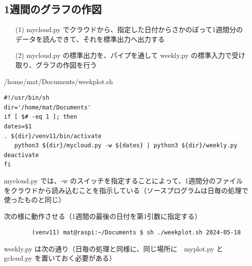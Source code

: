 \documentclass[12pt,a4j]{jsbook}
\begin{document}
\newpage

\subsection{1週間のグラフの作図}

\begin{enumerate}
	\item[(1)] mycloud.py でクラウドから、指定した日付からさかのぼって1週間分のデータを読んできて、それを標準出力へ出力する
	\item[(2)] mycloud.py の標準出力を、パイプを通して weekly.py の標準入力で受け取り、グラフの作図を行う
\end{enumerate}

\begin{spacing}{0.95}
\begin{itembox}[l]{/home/mat/Documents/weekplot.sh}
\begin{verbatim}
#!/usr/bin/sh
dir='/home/mat/Documents'
if [ $# -eq 1 ]; then
dates=$1
. ${dir}/venv11/bin/activate
   python3 ${dir}/mycloud.py -w ${dates} | python3 ${dir}/weekly.py
deactivate
fi
\end{verbatim}
\end{itembox}
\end{spacing}

mycloud.py では、-w のスイッチを指定することによって、1週間分のファイルをクラウドから読み込むことを指示している（ソースプログラムは日毎の処理で使ったものと同じ）

次の様に動作させる（1週間の最後の日付を第1引数に指定する）

\begin{spacing}{0.95}
\begin{screen}
\begin{verbatim}
		(venv11) mat@raspi:~/Documents $ sh ./weekplot.sh 2024-05-18
\end{verbatim}
\end{screen}
\end{spacing}

weekly.py は次の通り（日毎の処理と同様に、同じ場所に　myplot.py と gcloud.py を置いておく必要がある）
\end{document}
